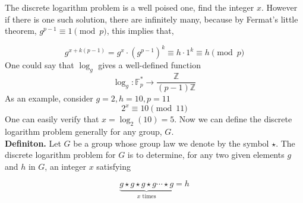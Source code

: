 \documentclass{article}
\begin{document}
\noindent The discrete logarithm problem is a well poised one, find the integer $x$. However if there is one such solution, there are infinitely many, because by Fermat's little theorem, $g^{p-1} \equiv 1 \pmod p$, this implies that,

\begin{equation}
    g^{x + k(p-1)} = g^x \cdot (g^{p-1})^k \equiv h \cdot 1^k \equiv h \pmod p
\end{equation}
One could say that $\log_g$ gives a well-defined function
\begin{equation}
    \log_g : \mathbb{F}_p^* \rightarrow \frac{\mathbb{Z}}{(p-1) \mathbb{Z}}
\end{equation}
As an example, consider $g = 2, h = 10, p = 11$
\begin{equation*}
    2^x \equiv 10 \pmod {11}
\end{equation*}
One can easily verify that $x = \log_2(10) = 5$. Now we can define the discrete logarithm problem generally for any group, $G$. \\

\noindent \textbf{Definiton.} Let $G$ be a group whose group law we denote by the symbol $\star$. The discrete logarithm problem for $G$ is to determine, for any two given elements $g$ and $h$ in $G$, an integer $x$ satisfying

\begin{equation}
    \underbrace{g \star g \star g \star g \cdots \star g}_{x \text{ times}} = h
\end{equation}
\end{document}
